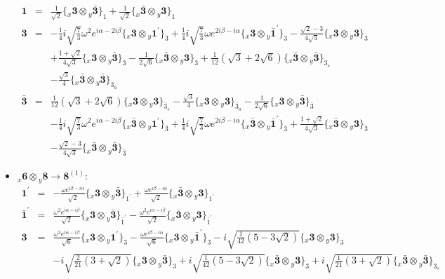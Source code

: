 \documentclass[english]{article}
\newcommand{\rep}[1]{\mathbf{#1}}
\newcommand{\repx}[2]{{}_{#2}\mathbf{#1}}
\newcommand{\subcg}[3]{\big\{ \repx{#1}{x}\otimes\repx{#2}{y}\big\}^{}_{#3}}
\begin{document}
\begin{itemize}
\begin{eqnarray*}
\rep{1} &=& \frac{1}{\sqrt{2}}\subcg{3}{\bar{3}}{1}+\frac{1}{\sqrt{2}}\subcg{\bar{3}}{3}{1}
\\
\rep{3} &=& -\frac{1}{4} i \sqrt{\frac{7}{3}} \omega ^2 e^{i \alpha -2 i \beta }\subcg{3}{1^{\prime}}{3}+\frac{1}{4} i \sqrt{\frac{7}{3}} \omega  e^{2 i \beta -i \alpha }\subcg{3}{\bar{1}^{\prime}}{3}-\frac{\sqrt{2}-3}{4 \sqrt{3}}\subcg{3}{3}{3} \\ 
 & & +\frac{1+\sqrt{2}}{4 \sqrt{3}}\subcg{3}{\bar{3}}{3}-\frac{1}{2 \sqrt{6}}\subcg{\bar{3}}{3}{3}+\frac{1}{12} \left(\sqrt{3}+2 \sqrt{6}\right)\subcg{\bar{3}}{\bar{3}}{3_{s}} \\ 
 & & -\frac{\sqrt{3}}{4}\subcg{\bar{3}}{\bar{3}}{3_{a}}
\\
\rep{\bar{3}} &=& \frac{1}{12} \left(\sqrt{3}+2 \sqrt{6}\right)\subcg{3}{3}{\bar{3}_{s}}-\frac{\sqrt{3}}{4}\subcg{3}{3}{\bar{3}_{a}}-\frac{1}{2 \sqrt{6}}\subcg{3}{\bar{3}}{\bar{3}} \\ 
 & & -\frac{1}{4} i \sqrt{\frac{7}{3}} \omega ^2 e^{i \alpha -2 i \beta }\subcg{\bar{3}}{1^{\prime}}{\bar{3}}+\frac{1}{4} i \sqrt{\frac{7}{3}} \omega  e^{2 i \beta -i \alpha }\subcg{\bar{3}}{\bar{1}^{\prime}}{\bar{3}}+\frac{1+\sqrt{2}}{4 \sqrt{3}}\subcg{\bar{3}}{3}{\bar{3}} \\ 
 & & -\frac{\sqrt{2}-3}{4 \sqrt{3}}\subcg{\bar{3}}{\bar{3}}{\bar{3}}
\end{eqnarray*}
\item $\repx{6}{x}\otimes\repx{8}{y}\to\rep{8}^{(1)}$:
\begin{eqnarray*}
\rep{1^{\prime}} &=& -\frac{\omega  e^{i \beta -i \alpha }}{\sqrt{2}}\subcg{3}{\bar{3}}{1^{\prime}}+\frac{\omega  e^{i \beta -i \alpha }}{\sqrt{2}}\subcg{\bar{3}}{3}{1^{\prime}}
\\
\rep{\bar{1}^{\prime}} &=& \frac{\omega ^2 e^{i \alpha -i \beta }}{\sqrt{2}}\subcg{3}{\bar{3}}{\bar{1}^{\prime}}-\frac{\omega ^2 e^{i \alpha -i \beta }}{\sqrt{2}}\subcg{\bar{3}}{3}{\bar{1}^{\prime}}
\\
\rep{3} &=& \frac{\omega ^2 e^{i \alpha -i \beta }}{\sqrt{6}}\subcg{3}{1^{\prime}}{3}-\frac{\omega  e^{i \beta -i \alpha }}{\sqrt{6}}\subcg{3}{\bar{1}^{\prime}}{3}-i \sqrt{\frac{1}{42} \left(5-3 \sqrt{2}\right)}\subcg{3}{3}{3} \\ 
 & & -i \sqrt{\frac{2}{21} \left(3+\sqrt{2}\right)}\subcg{3}{\bar{3}}{3}+i \sqrt{\frac{1}{42} \left(5-3 \sqrt{2}\right)}\subcg{\bar{3}}{3}{3}+i \sqrt{\frac{1}{21} \left(3+\sqrt{2}\right)}\subcg{\bar{3}}{\bar{3}}{3_{s}}
\\

\end{eqnarray*}
\end{itemize}
\end{document}
